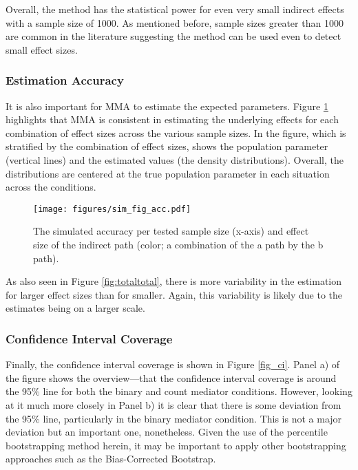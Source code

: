 \documentclass[]{DissertateUSU}
\begin{document}
Overall, the method has the statistical power for even very small
indirect effects with a sample size of 1000. As mentioned before, sample
sizes greater than 1000 are common in the literature suggesting the
method can be used even to detect small effect sizes.

\subsubsection{Estimation Accuracy}\label{estimation-accuracy}

It is also important for MMA to estimate the expected parameters. Figure
\ref{fig_acc} highlights that MMA is consistent in estimating the
underlying effects for each combination of effect sizes across the
various sample sizes. In the figure, which is stratified by the
combination of effect sizes, shows the population parameter (vertical
lines) and the estimated values (the density distributions). Overall,
the distributions are centered at the true population parameter in each
situation across the conditions.

\begin{figure}[tb]
\centering
\texttt{[image: figures/sim\_fig\_acc.pdf]}
\caption{The simulated accuracy per tested sample size (x-axis) and effect size of the indirect path (color; a combination of the a path by the b path).}
\label{fig_acc}
\end{figure}

As also seen in Figure \ref{fig:totaltotal}, there is more variability
in the estimation for larger effect sizes than for smaller. Again, this
variability is likely due to the estimates being on a larger scale.

\subsubsection{Confidence Interval
Coverage}\label{confidence-interval-coverage}

Finally, the confidence interval coverage is shown in Figure
\ref{fig_ci}. Panel a) of the figure shows the overview---that the
confidence interval coverage is around the 95\% line for both the binary
and count mediator conditions. However, looking at it much more closely
in Panel b) it is clear that there is some deviation from the 95\% line,
particularly in the binary mediator condition. This is not a major
deviation but an important one, nonetheless. Given the use of the
percentile bootstrapping method herein, it may be important to apply
other bootstrapping approaches such as the Bias-Corrected Bootstrap.
\end{document}
